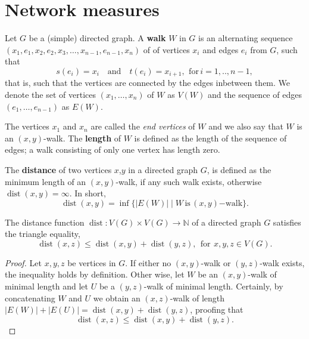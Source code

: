 







\section{Network measures}\label{sec:network_measures}


Let $G$ be a (simple) directed graph. A \textbf{walk} $W$ in $G$ is an
alternating sequence
$(x_1,e_1,x_2,e_2,x_3,\ldots,x_{n-1},e_{n-1},x_n)$ of of vertices
$x_i$ and edges $e_i$ from $G$, such that
\[
s(e_i) = x_i \quad \mathrm{and} \quad t(e_i) = x_{i+1}, \:\,
\mathrm{for}\, i=1,..,n-1,
\]
that is, such that the vertices are connected by the edges inbetween
them. We denote the set of vertices $(x_1,\ldots,x_n)$ of $W$ as
$V(W)$ and the sequence of edges $(e_1,\dots,e_{n-1})$ as $E(W)$.

The vertices $x_1$ and $x_n$ are called the \textit{end vertices} of
$W$ and we also say that $W$ is an $(x,y)$-walk. The \textbf{length}
of $W$ is defined as the length of the sequence of edges; a walk
consisting of only one vertex has length zero.

\begin{definition}[Distance]
  The \textbf{distance} of two vertices $x$,$y$ in a directed graph
  $G$, is defined as the minimum length of an
  $(x,y)$-walk, if any such walk exists, otherwise
  $\operatorname{dist}(x,y)=\infty$. In short,
  \[
  \operatorname{dist}(x,y) = \inf \{|E(W)| \mid
  W\,\mathrm{is}\,(x,y)\mathrm{-walk}\}.
  \]
\end{definition}

\begin{proposition}
  The distance function $\operatorname{dist}: V(G) \times V(G) \to
  \mathbb{N}$ of a directed graph $G$ satisfies the triangle equality,
  \[
  \operatorname{dist}(x,z) \le \operatorname{dist}(x,y) +
  \operatorname{dist}(y,z), \:\: \mathrm{for}\:\, x,y,z \in V(G).
  \]
\end{proposition}

\begin{proof}
  Let $x,y,z$ be vertices in $G$. If either no $(x,y)$-walk or
  $(y,z)$-walk exists, the inequality holds by definition. Other wise,
  let $W$ be an $(x,y)$-walk of minimal length and let $U$ be a
  $(y,z)$-walk of minimal length. Certainly, by concatenating $W$ and
  $U$ we obtain an $(x,z)$-walk of length $|E(W)| + |E(U)| =
  \operatorname{dist}(x,y) + \operatorname{dist}(y,z)$, proofing
  that \[ \operatorname{dist}(x,z) \le \operatorname{dist}(x,y) +
  \operatorname{dist}(y,z).\]\end{proof}



